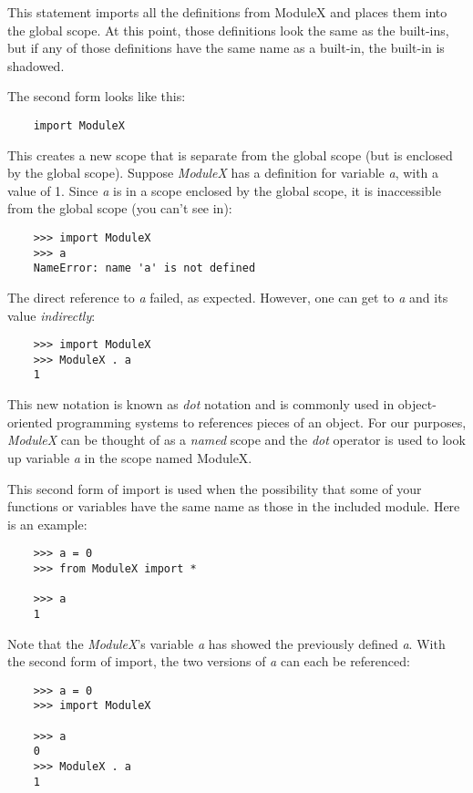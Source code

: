 This statement imports all the definitions from ModuleX and places
them into the global scope. At this point, those definitions
look the same as the built-ins, but if any of those definitions
have the same name as a built-in, the built-in is shadowed.

The second form looks like this:

\begin{verbatim}
    import ModuleX
\end{verbatim}

This creates a new scope that is separate from the global scope
(but is enclosed by the global scope).
Suppose
{\it ModuleX} has a definition for variable {\it a}, with a value
of 1.
Since {\it a} is in a scope
enclosed by the global scope, it is inaccessible from the global
scope (you can't see in):

\begin{verbatim}
    >>> import ModuleX
    >>> a
    NameError: name 'a' is not defined
\end{verbatim}

The direct reference to {\it a} failed, as expected.
However, one can get to {\it a} and its value {\it indirectly}:

\begin{verbatim}
    >>> import ModuleX
    >>> ModuleX . a
    1
\end{verbatim}

This new notation is known as {\it dot} notation and is commonly
used in object-oriented programming systems to references pieces
of an object. For our purposes, {\it ModuleX} can be thought
of as
a {\it named} scope and the {\it dot} operator is used to look
up variable {\it a} in the scope named ModuleX.

This second form of import is used when the possibility that
some of your functions or variables have the same name as
those in the included module. Here is an example:

\begin{verbatim}
    >>> a = 0
    >>> from ModuleX import *

    >>> a
    1
\end{verbatim}

Note that the {\it ModuleX}'s variable {\it a} has showed the previously
defined {\it a}. With the second form of import, the two versions
of {\it a} can each be referenced:

\begin{verbatim}
    >>> a = 0
    >>> import ModuleX

    >>> a
    0
    >>> ModuleX . a
    1
\end{verbatim}

